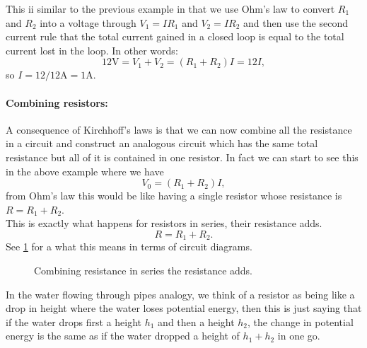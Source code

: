 \documentclass[a4paper,12pt]{book}
\begin{document}
This ii similar to the previous example in that we use Ohm's law to convert $R_{1}$ and $R_{2}$ into a voltage through $V_{1}=I R_{1}$ and $V_{2}=I R_{2}$ and then use the second current rule that the total current gained in a closed loop is equal to the total current lost in the loop. In other words:
\begin{equation*}
12\text{V}=V_{1}+V_{2}=\left(R_{1}+R_{2}\right)I=12I,
\end{equation*}
so $I=12/12 \text{A}=1\text{A}$.


\paragraph{Combining resistors:} A consequence of Kirchhoff's laws is that we can now combine all the resistance in a circuit and construct an analogous circuit which has the same total resistance but all of it is contained in one resistor. In fact we can start to see this in the above example where we have 
\begin{equation*}
V_{0}=\left(R_{1}+R_{2}\right)I,
\end{equation*}
from Ohm's law this would be like having a single resistor whose resistance is $R=R_{1}+R_{2}$. \\


This is exactly what happens for resistors in series, their resistance adds. 
\begin{equation}
R=R_{1}+R_{2}.
\label{eq: resistors in series}
\end{equation} 
See \cref{fig: resistance in series} for a what this means in terms of circuit diagrams.\\
  \begin{figure}[ht]
    \centering
    \caption{Combining resistance in series the resistance adds.}
    \label{fig: resistance in series}
\end{figure}

In the water flowing through pipes analogy, we think of a resistor as being like a drop in height where the water loses potential energy, then this is just saying that if the water drops first a height $h_{1}$ and then a height $h_{2}$, the change in potential energy is the same as if the water dropped a height of $h_{1}+h_{2}$ in one go.\\
\end{document}
